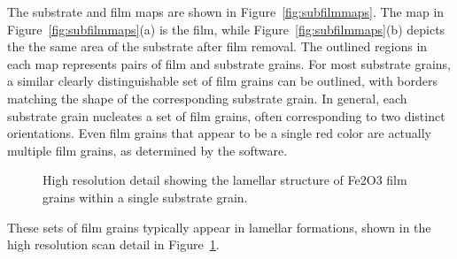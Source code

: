 \documentclass[12pt,%
              twoside,
               letterpaper]{uiothesis}
\begin{document}
The substrate and film maps are shown in Figure~\ref{fig:subfilmmaps}. The map in
Figure~\ref{fig:subfilmmaps}(a) is the film, while Figure~\ref{fig:subfilmmaps}(b) depicts the the
same area of the substrate after film removal. The outlined regions in each map represents
pairs of film and substrate grains. For most substrate grains, a similar clearly
distinguishable set of film grains can be outlined, with borders matching the shape of the
corresponding substrate grain. In general, each substrate grain nucleates a set of film
grains, often corresponding to two distinct orientations. Even film grains that appear to
be a single red color are actually multiple film grains, as determined by the 
software. 
\begin{figure}
\begin{center}
		\caption[Detail of  map]{%
			High resolution  detail showing the lamellar
			structure of Fe2O3 film grains within a single substrate
			grain.}
	\label{fig:zoommap}
\end{center}
\end{figure}
These sets of film grains typically appear in lamellar formations, shown in the high
resolution scan detail in Figure~\ref{fig:zoommap}.
\end{document}

